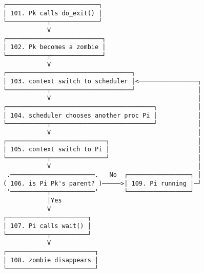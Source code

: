 \documentclass[varwidth,crop]{standalone}
\begin{document}
\begin{verbatim}
┌─────────────────────────┐
│ 101. Pk calls do_exit() │
└───────────┬─────────────┘
            V
┌──────────────────────────┐
│ 102. Pk becomes a zombie │
└───────────┬──────────────┘
            V
┌──────────────────────────────────┐
│ 103. context switch to scheduler │<────────────────┐
└───────────┬──────────────────────┘                 │
            V                                        │
┌────────────────────────────────────────┐           │
│ 104. scheduler chooses another proc Pi │           │
└───────────┬────────────────────────────┘           │
            V                                        │
┌───────────────────────────┐                        │
│ 105. context switch to Pi │                        │
└───────────┬───────────────┘                        │
            V                                        │
 .───────────────────────.   No  ┌─────────────────┐ │
( 106. is Pi Pk's parent? )─────>│ 109. Pi running │─┘
 '──────────┬────────────'       └─────────────────┘
            │Yes
            V
┌──────────────────────┐
│ 107. Pi calls wait() │
└───────────┬──────────┘
            V
┌────────────────────────┐
│ 108. zombie disappears │
└────────────────────────┘
\end{verbatim}
\end{document}
